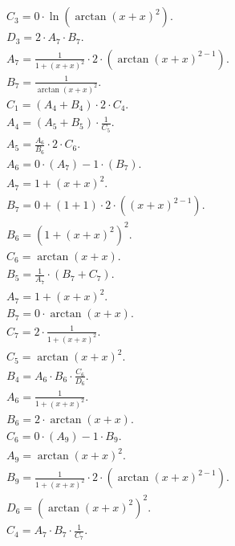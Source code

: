 \documentclass[12pt,a4paper]{extreport}
\begin{document}
\begin{multline}
\\
C_{3} = 0 \cdot \ln(\arctan(x + x) ^ {2}).\\
D_{3} = 2 \cdot A_{7} \cdot B_{7}.\\
A_{7} = \frac{1}{1 + (x + x) ^ {2}} \cdot 2 \cdot (\arctan(x + x) ^ {2 - 1}).\\
B_{7} = \frac{1}{\arctan(x + x) ^ {2}}.\\
C_{1} = (A_{4} + B_{4}) \cdot 2 \cdot C_{4}.\\
A_{4} = (A_{5} + B_{5}) \cdot \frac{1}{C_{5}}.\\
A_{5} = \frac{A_{6}}{B_{6}} \cdot 2 \cdot C_{6}.\\
A_{6} = 0 \cdot (A_{7}) - 1 \cdot (B_{7}).\\
A_{7} = 1 + (x + x) ^ {2}.\\
B_{7} = 0 + (1 + 1) \cdot 2 \cdot ((x + x) ^ {2 - 1}).\\
B_{6} = (1 + (x + x) ^ {2}) ^ {2}.\\
C_{6} = \arctan(x + x).\\
B_{5} = \frac{1}{A_{7}} \cdot (B_{7} + C_{7}).\\
A_{7} = 1 + (x + x) ^ {2}.\\
B_{7} = 0 \cdot \arctan(x + x).\\
C_{7} = 2 \cdot \frac{1}{1 + (x + x) ^ {2}}.\\
C_{5} = \arctan(x + x) ^ {2}.\\
B_{4} = A_{6} \cdot B_{6} \cdot \frac{C_{6}}{D_{6}}.\\
A_{6} = \frac{1}{1 + (x + x) ^ {2}}.\\
B_{6} = 2 \cdot \arctan(x + x).\\
C_{6} = 0 \cdot (A_{9}) - 1 \cdot B_{9}.\\
A_{9} = \arctan(x + x) ^ {2}.\\
B_{9} = \frac{1}{1 + (x + x) ^ {2}} \cdot 2 \cdot (\arctan(x + x) ^ {2 - 1}).\\
D_{6} = (\arctan(x + x) ^ {2}) ^ {2}.\\
C_{4} = A_{7} \cdot B_{7} \cdot \frac{1}{C_{7}}.\\
\end{multline}
\end{document}
